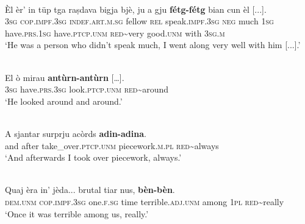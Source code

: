 \ea\label{ex:redadv1}
\\
\gll  Èl èr’ in tüp tga raṣdava bigja bjè, ju a gju \textbf{fétg-fétg} bian cun èl [...]. \\
\textsc{3sg} \textsc{cop.impf.3sg} \textsc{indef.art.m.sg} fellow \textsc{rel} speak.\textsc{impf.3sg} \textsc{neg} much \textsc{1sg} have.\textsc{prs.1sg} have.\textsc{ptcp.unm} \textsc{red}\textasciitilde{very} good.\textsc{unm} with \textsc{3sg.m}\\
\glt `He was a person who didn’t speak much, I went along very well with him [...].'
\z

\ea\label{ex:redadv2}
\\
\gll El ò mirau \textbf{antùrn-antùrn} […].\\
     \textsc{3sg} have.\textsc{prs.3sg} look.\textsc{ptcp.unm} \textsc{red}\textasciitilde{around} \\
\glt `He looked around and around.'
\z

\ea\label{ex:redadv3}
\\
\gll    A sjantar surprju acòrds \textbf{adin-adina}.\\
and after take\_over.\textsc{ptcp.unm} piecework.\textsc{m.pl} \textsc{red}\textasciitilde{always} \\
\glt `And afterwards I took over piecework, always.'
\z

\ea\label{ex:redadv4}
\\
\gll Quaj èra in’ jèda... brutal tiar nus, \textbf{bèn-bèn}.   \\
\textsc{dem.unm} \textsc{cop.impf.3sg} one.\textsc{f.sg} time terrible.\textsc{adj.unm} among \textsc{1pl} \textsc{red}\textasciitilde{really}\\
\glt `Once it was terrible among us, really.'
\z

